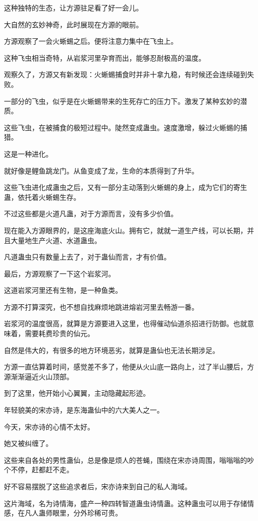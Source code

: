 \begin{this_body}
这种独特的生态，让方源驻足看了好一会儿。

大自然的玄妙神奇，此时展现在方源的眼前。

方源观察了一会火蜥蜴之后。便将注意力集中在飞虫上。

这种飞虫相当奇特，从岩浆河里孕育而出，能够忍耐极高的温度。

观察久了，方源又有新发现：火蜥蜴捕食时并非十拿九稳，有时候还会连续碰到失败。

一部分的飞虫，似乎是在火蜥蜴带来的生死存亡的压力下。激发了某种玄妙的潜质。

这些飞虫，在被捕食的极短过程中。陡然变成蛊虫。速度激增，躲过火蜥蜴的捕猎。

这是一种进化。

就好像是鲤鱼跳龙门。从鱼变成了龙，生命的本质得到了升华。

这些飞虫进化成蛊虫之后，又有一部分主动落到火蜥蜴的身上，成为它们的寄生蛊，依托着火蜥蜴生存。

不过这些都是火道凡蛊，对于方源而言，没有多少价值。

现在能入方源眼界的，是这座海底火山。拥有它，就就一道生产线，可以长期，并且大量地生产火道、水道蛊虫。

凡道蛊虫只有数量上去了，对于蛊仙而言，才有价值。

最后，方源观察了一下这个岩浆河。

这道岩浆河里还有生物，是一种鱼类。

方源不打算深究，也不想自找麻烦地跳进熔岩河里去畅游一番。

岩浆河的温度很高，就算是方源要进入这里，也得催动仙道杀招进行防御。也就意味着，需要耗费珍贵的仙元。

自然是伟大的，有很多的地方环境恶劣，就算是蛊仙也无法长期涉足。

方源一直估算着时间，感觉差不多了，他便从火山底一路向上，过了半山腰后，方源渐渐逼近火山顶部。

到了这里，他开始小心翼翼，主动隐藏起形迹。

年轻貌美的宋亦诗，是东海蛊仙中的六大美人之一。

今天，宋亦诗的心情不太好。

她又被纠缠了。

这些来自各处的男性蛊仙，总是像是烦人的苍蝇，围绕在宋亦诗周围，嗡嗡嗡的吵个不停，赶都赶不走。

好不容易摆脱了这些追求者后，宋亦诗来到自己的私人海域。

这片海域，名为诗情海，盛产一种四转智道蛊虫诗情蛊。这种蛊虫可以用于存储情感，在凡人蛊师眼里，分外珍稀可贵。


\end{this_body}
